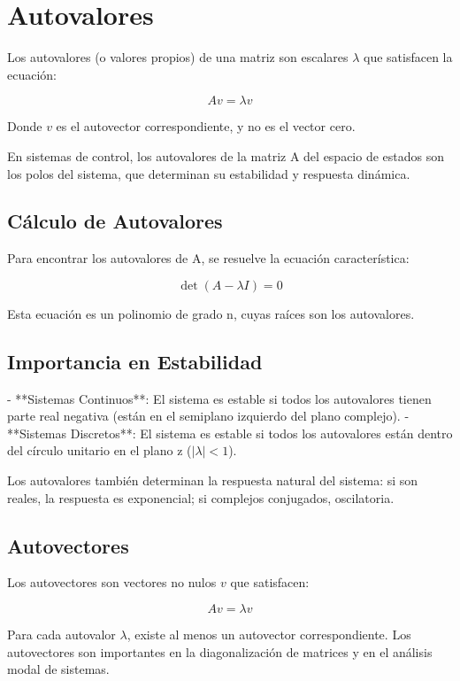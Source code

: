 \documentclass[legalpaper,twocolumn]{article}
\begin{document}
\section*{Autovalores}

Los autovalores (o valores propios) de una matriz son escalares \(\lambda\) que satisfacen la ecuación:

\[ A v = \lambda v \]

Donde \(v\) es el autovector correspondiente, y no es el vector cero.

En sistemas de control, los autovalores de la matriz A del espacio de estados son los polos del sistema, que determinan su estabilidad y respuesta dinámica.

\subsection*{Cálculo de Autovalores}

Para encontrar los autovalores de A, se resuelve la ecuación característica:

\[ \det(A - \lambda I) = 0 \]

Esta ecuación es un polinomio de grado n, cuyas raíces son los autovalores.

\subsection*{Importancia en Estabilidad}

- **Sistemas Continuos**: El sistema es estable si todos los autovalores tienen parte real negativa (están en el semiplano izquierdo del plano complejo).
- **Sistemas Discretos**: El sistema es estable si todos los autovalores están dentro del círculo unitario en el plano z ($|\lambda| < 1$).

Los autovalores también determinan la respuesta natural del sistema: si son reales, la respuesta es exponencial; si complejos conjugados, oscilatoria.

\subsection*{Autovectores}

Los autovectores son vectores no nulos \( v \) que satisfacen:

\[ A v = \lambda v \]

Para cada autovalor \(\lambda\), existe al menos un autovector correspondiente. Los autovectores son importantes en la diagonalización de matrices y en el análisis modal de sistemas.
\end{document}

